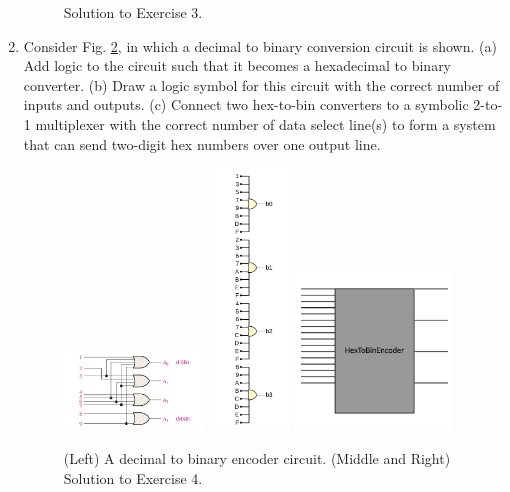 \documentclass[10pt]{article}
\begin{document}
\begin{enumerate}
\begin{figure}[hb]
\caption{\label{fig:solution3} Solution to Exercise 3.}
\end{figure}
\item Consider Fig. \ref{fig:enc}, in which a decimal to binary conversion circuit is shown. (a) Add logic to the circuit such that it becomes a hexadecimal to binary converter. (b) Draw a logic symbol for this circuit with the correct number of inputs and outputs.  (c) Connect two hex-to-bin converters to a symbolic 2-to-1 multiplexer with the correct number of data select line(s) to form a system that can send two-digit hex numbers over one output line.
\begin{figure}[ht]
\centering
\includegraphics[width=0.35\textwidth]{figures/encoder.pdf}
\includegraphics[width=0.2\textwidth]{figures/gateExample14.pdf}
\includegraphics[width=0.4\textwidth]{figures/design5.pdf}
\caption{\label{fig:enc} (Left) A decimal to binary encoder circuit. (Middle and Right) Solution to Exercise 4.}

\end{figure}
\end{enumerate}
\end{document}
